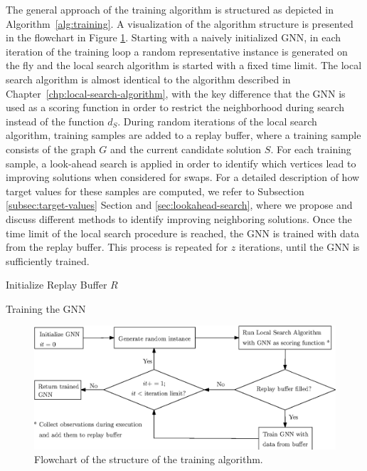 \documentclass[draft,final]{vutinfth} %
\begin{document}
The general approach of the training algorithm is structured as depicted in Algorithm~\ref{alg:training}. A visualization of the algorithm structure is presented in the flowchart in Figure \ref{fig:flowchart-training-algorithm}. 
Starting with a naively initialized GNN, in each iteration of the training loop a random representative instance is generated on the fly and the local search algorithm is started with a fixed time limit. The local search algorithm is almost identical to the algorithm described in Chapter~\ref{chp:local-search-algorithm}, with the key difference that the GNN is used as a scoring function in order to restrict the neighborhood during search instead of the function $d_S$. 
During random iterations of the local search algorithm, training samples are added to a replay buffer, where a training sample consists of the graph $G$ and the current candidate solution $S$. For each training sample, a look-ahead search is applied in order to identify which vertices lead to improving solutions when considered for swaps. For a detailed description of how target values for these samples are computed, we refer to Subsection \ref{subsec:target-values} Section and \ref{sec:lookahead-search}, where we propose and discuss different methods to identify improving neighboring solutions. 
Once the time limit of the local search procedure is reached, the GNN is trained with data from the replay buffer. 
This process is repeated for $z$ iterations, until the GNN is sufficiently trained. 

\begin{algorithm}
    \DontPrintSemicolon
    Initialize Replay Buffer $R$ \;
    \caption{Training the GNN}
    \label{alg:training}
\end{algorithm}

\begin{figure}
    \centering
    \includegraphics[width=\textwidth]{graphics/flowchart_training_algorithm.eps}
    \caption{Flowchart of the structure of the training algorithm.}
    \label{fig:flowchart-training-algorithm}
\end{figure}
\end{document}

